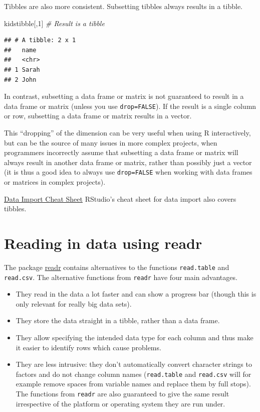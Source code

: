 \documentclass[
]{book}
\newenvironment{Shaded}{\begin{snugshade}}{\end{snugshade}}
\newcommand{\CommentTok}[1]{\textcolor[rgb]{0.56,0.35,0.01}{\textit{#1}}}
\newcommand{\DecValTok}[1]{\textcolor[rgb]{0.00,0.00,0.81}{#1}}
\newcommand{\NormalTok}[1]{#1}
\providecommand{\tightlist}{%
  \setlength{\itemsep}{0pt}\setlength{\parskip}{0pt}}
\begin{document}
Tibbles are also more consistent. Subsetting tibbles always results in a tibble.

\begin{Shaded}
\begin{Highlighting}[]
\NormalTok{kidstibble[,}\DecValTok{1}\NormalTok{]                            }\CommentTok{\# Result is a tibble}
\end{Highlighting}
\end{Shaded}

\begin{verbatim}
## # A tibble: 2 x 1
##   name 
##   <chr>
## 1 Sarah
## 2 John
\end{verbatim}

In contrast, subsetting a data frame or matrix is not guaranteed to result in a data frame or matrix (unless you use \texttt{drop=FALSE}). If the result is a single column or row, subsetting a data frame or matrix results in a vector.

This ``dropping'' of the dimension can be very useful when using R interactively, but can be the source of many issues in more complex projects, when programmers incorrectly assume that subsetting a data frame or matrix will always result in another data frame or matrix, rather than possibly just a vector (it is thus a good idea to always use \texttt{drop=FALSE} when working with data frames or matrices in complex projects).

\href{\%22https://github.com/rstudio/cheatsheets/raw/main/data-import.pdf\%22}{Data Import Cheat Sheet}
RStudio's cheat sheet for data import also covers tibbles.

\hypertarget{reading-in-data-using-readr}{%
\section{Reading in data using readr}\label{reading-in-data-using-readr}}

The package \href{https://cran.r-project.org/web/packages/readr/index.html}{readr} contains alternatives to the functions \texttt{read.table} and \texttt{read.csv}. The alternative functions from \texttt{readr} have four main advantages.

\begin{itemize}
\tightlist
\item
  They read in the data a lot faster and can show a progress bar (though this is only relevant for really big data sets).
\item
  They store the data straight in a tibble, rather than a data frame.
\item
  They allow specifying the intended data type for each column and thus make it easier to identify rows which cause problems.
\item
  They are less intrusive: they don't automatically convert character strings to factors and do not change column names (\texttt{read.table} and \texttt{read.csv} will for example remove spaces from variable names and replace them by full stops). The functions from \texttt{readr} are also guaranteed to give the same result irrespective of the platform or operating system they are run under.
\end{itemize}
\end{document}
